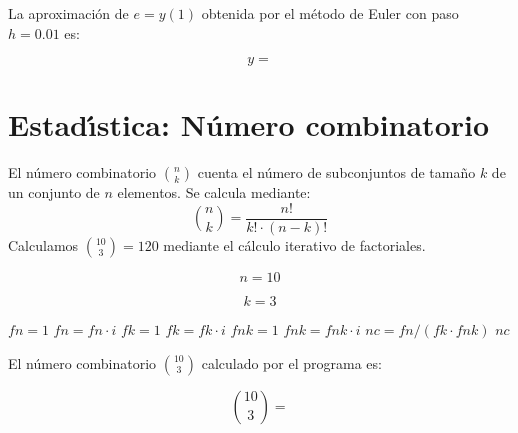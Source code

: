 \documentclass{article}
\begin{document}
La aproximaci\'on de $e = y(1)$ obtenida por el m\'etodo de Euler con paso $h = 0.01$ es:

\begin{equation}
    y =
    \label{eq:res:y}
\end{equation}


\section{Estad\'{\i}stica: N\'umero combinatorio}

El n\'umero combinatorio $\binom{n}{k}$ cuenta el n\'umero de subconjuntos de tama\~no
$k$ de un conjunto de $n$ elementos. Se calcula mediante:
\[
    \binom{n}{k} = \frac{n!}{k! \cdot (n-k)!}
\]
Calculamos $\binom{10}{3} = 120$ mediante el c\'alculo iterativo de factoriales.

\begin{equation}
    n = 10
    \label{eq:calc:n}
\end{equation}

\begin{equation}
    k = 3
    \label{eq:calc:k}
\end{equation}

\begin{algorithm}
\caption{C\'alculo de $\binom{n}{k}$ mediante factoriales iterativos}
\label{alg:calc:nc}
\begin{algorithmic}
    \STATE $fn = 1$
        \STATE $fn = fn \cdot i$
    \ENDFOR
    \STATE $fk = 1$
        \STATE $fk = fk \cdot i$
    \ENDFOR
    \STATE $fnk = 1$
        \STATE $fnk = fnk \cdot i$
    \ENDFOR
    \STATE $nc = fn / (fk \cdot fnk)$
    \RETURN $nc$
\end{algorithmic}
\end{algorithm}

El n\'umero combinatorio $\binom{10}{3}$ calculado por el programa es:

\begin{equation}
    \binom{10}{3} =
    \label{eq:res:nc}
\end{equation}

\end{document}
